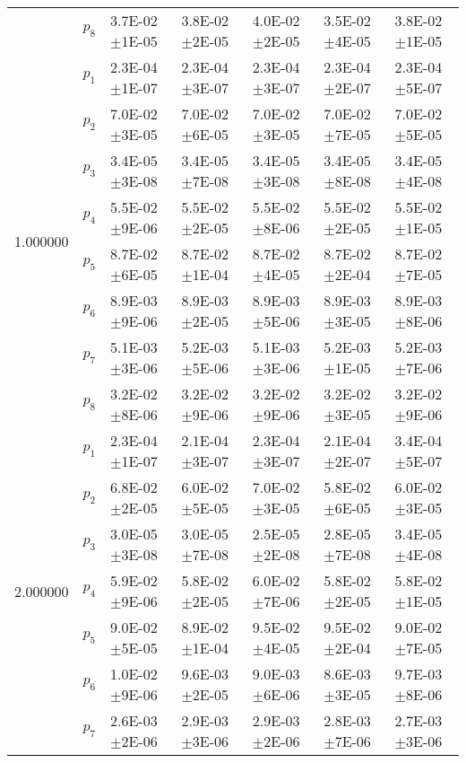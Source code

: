 \begin{tabular}{lllllll}
 & $p_8$ & 3.7E-02\(\pm\)1E-05 & 3.8E-02\(\pm\)2E-05 & 4.0E-02\(\pm\)2E-05 & 3.5E-02\(\pm\)4E-05 & 3.8E-02\(\pm\)1E-05 \\
\multirow[c]{8}{*}{1.000000} & $p_1$ & 2.3E-04\(\pm\)1E-07 & 2.3E-04\(\pm\)3E-07 & 2.3E-04\(\pm\)3E-07 & 2.3E-04\(\pm\)2E-07 & 2.3E-04\(\pm\)5E-07 \\
 & $p_2$ & 7.0E-02\(\pm\)3E-05 & 7.0E-02\(\pm\)6E-05 & 7.0E-02\(\pm\)3E-05 & 7.0E-02\(\pm\)7E-05 & 7.0E-02\(\pm\)5E-05 \\
 & $p_3$ & 3.4E-05\(\pm\)3E-08 & 3.4E-05\(\pm\)7E-08 & 3.4E-05\(\pm\)3E-08 & 3.4E-05\(\pm\)8E-08 & 3.4E-05\(\pm\)4E-08 \\
 & $p_4$ & 5.5E-02\(\pm\)9E-06 & 5.5E-02\(\pm\)2E-05 & 5.5E-02\(\pm\)8E-06 & 5.5E-02\(\pm\)2E-05 & 5.5E-02\(\pm\)1E-05 \\
 & $p_5$ & 8.7E-02\(\pm\)6E-05 & 8.7E-02\(\pm\)1E-04 & 8.7E-02\(\pm\)4E-05 & 8.7E-02\(\pm\)2E-04 & 8.7E-02\(\pm\)7E-05 \\
 & $p_6$ & 8.9E-03\(\pm\)9E-06 & 8.9E-03\(\pm\)2E-05 & 8.9E-03\(\pm\)5E-06 & 8.9E-03\(\pm\)3E-05 & 8.9E-03\(\pm\)8E-06 \\
 & $p_7$ & 5.1E-03\(\pm\)3E-06 & 5.2E-03\(\pm\)5E-06 & 5.1E-03\(\pm\)3E-06 & 5.2E-03\(\pm\)1E-05 & 5.2E-03\(\pm\)7E-06 \\
 & $p_8$ & 3.2E-02\(\pm\)8E-06 & 3.2E-02\(\pm\)9E-06 & 3.2E-02\(\pm\)9E-06 & 3.2E-02\(\pm\)3E-05 & 3.2E-02\(\pm\)9E-06 \\
\multirow[c]{8}{*}{2.000000} & $p_1$ & 2.3E-04\(\pm\)1E-07 & 2.1E-04\(\pm\)3E-07 & 2.3E-04\(\pm\)3E-07 & 2.1E-04\(\pm\)2E-07 & 3.4E-04\(\pm\)5E-07 \\
 & $p_2$ & 6.8E-02\(\pm\)2E-05 & 6.0E-02\(\pm\)5E-05 & 7.0E-02\(\pm\)3E-05 & 5.8E-02\(\pm\)6E-05 & 6.0E-02\(\pm\)3E-05 \\
 & $p_3$ & 3.0E-05\(\pm\)3E-08 & 3.0E-05\(\pm\)7E-08 & 2.5E-05\(\pm\)2E-08 & 2.8E-05\(\pm\)7E-08 & 3.4E-05\(\pm\)4E-08 \\
 & $p_4$ & 5.9E-02\(\pm\)9E-06 & 5.8E-02\(\pm\)2E-05 & 6.0E-02\(\pm\)7E-06 & 5.8E-02\(\pm\)2E-05 & 5.8E-02\(\pm\)1E-05 \\
 & $p_5$ & 9.0E-02\(\pm\)5E-05 & 8.9E-02\(\pm\)1E-04 & 9.5E-02\(\pm\)4E-05 & 9.5E-02\(\pm\)2E-04 & 9.0E-02\(\pm\)7E-05 \\
 & $p_6$ & 1.0E-02\(\pm\)9E-06 & 9.6E-03\(\pm\)2E-05 & 9.0E-03\(\pm\)6E-06 & 8.6E-03\(\pm\)3E-05 & 9.7E-03\(\pm\)8E-06 \\
 & $p_7$ & 2.6E-03\(\pm\)2E-06 & 2.9E-03\(\pm\)3E-06 & 2.9E-03\(\pm\)2E-06 & 2.8E-03\(\pm\)7E-06 & 2.7E-03\(\pm\)3E-06 \\

\end{tabular}
